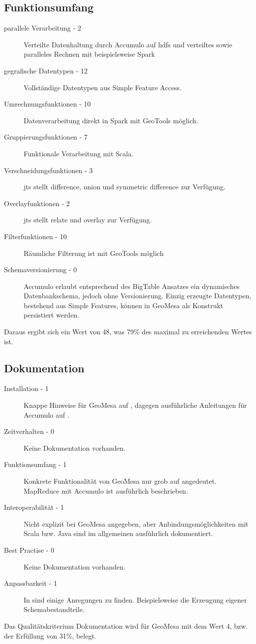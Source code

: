 \subsection{Funktionsumfang}
\begin{description}
\item[parallele Verarbeitung - 2] Verteilte Datenhaltung durch Accumulo auf \Gls{hdfs} und verteiltes sowie paralleles Rechnen mit beispielsweise Spark \cite{website:geomesaeclipse}
\item[gegrafische Datentypen - 12] Vollständige Datentypen aus Simple Feature Access. \cite{website:geomesaeclipse}
\item[Umrechnungsfunktionen - 10] Datenverarbeitung direkt in Spark mit GeoTools möglich. \cite{website:geotools-crs}
\item[Gruppierungsfunktionen - 7] Funktionale Verarbeitung mit Scala.
\item[Verschneidungsfunktionen - 3] \Gls{jts} stellt difference, union und symmetric difference zur Verfügung. \cite{website:jts-wikipedia}
\item[Overlayfunktionen - 2] \Gls{jts} stellt relate und overlay zur Verfügung.
\item[Filterfunktionen - 10] Räumliche Filterung ist  mit GeoTools möglich \cite{website:geotools-wiki}
\item[Schemaversionierung - 0] Accumulo erlaubt entsprechend des BigTable Ansatzes ein dynamisches Datenbankschema, jedoch ohne Versionierung. Einzig erzeugte Datentypen, bestehend aus Simple Features, können in GeoMesa als Konstrukt persistiert werden.
\end{description}
Daraus ergibt sich ein Wert von 48, was 79\% des maximal zu erreichenden Wertes ist.

\subsection{Dokumentation}
\begin{description}
\item[Installation - 1] Knappe Hinweise für GeoMesa auf \cite{website:geomesa-quickstart}, dagegen ausführliche Anleitungen für Accumulo auf \cite{website:accumulo-manual}.
\item[Zeitverhalten - 0] Keine Dokumentation vorhanden. %
\item[Funktionsumfang - 1] Konkrete Funktionalität von GeoMesa nur grob auf \cite{website:geomesa-tutorials} angedeutet. MapReduce mit Accumulo ist ausführlich beschrieben. \cite{website:accumulo-manual}
\item[Interoperabilität - 1] Nicht explizit bei GeoMesa angegeben, aber Anbindungsmöglichkeiten mit Scala bzw. Java sind im allgemeinen ausführlich dokumentiert.
\item[Best Practise - 0] Keine Dokumentation vorhanden.
\item[Anpassbarkeit - 1] In \cite{website:geomesa-tutorials} sind einige Anregungen zu finden. Beispielsweise die Erzeugung eigener Schemabestandteile. \cite{website:geomesa-simplefeatures}
\end{description}
Das Qualitätskriterium Dokumentation wird für GeoMesa mit dem Wert 4, bzw. der Erfüllung von 31\%,  belegt.


